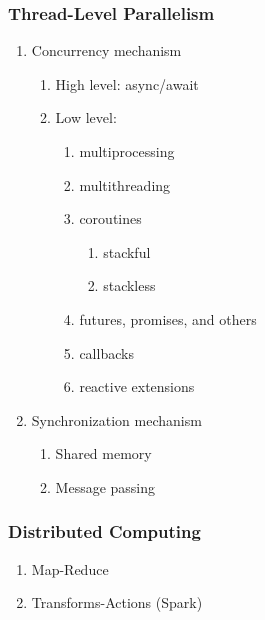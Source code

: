 \documentclass{article}
\begin{document}
\subsubsection{Thread-Level Parallelism}
\begin{enumerate}
    \item Concurrency mechanism
    \begin{enumerate}
        \item High level: async/await
        \item Low level:
        \begin{enumerate}
            \item multiprocessing
            \item multithreading
            \item coroutines
            \begin{enumerate}
                \item stackful
                \item stackless
            \end{enumerate}
            \item futures, promises, and others
            \item callbacks
            \item reactive extensions
        \end{enumerate}
    \end{enumerate}
    \item Synchronization mechanism
    \begin{enumerate}
        \item Shared memory
        \item Message passing
    \end{enumerate}
\end{enumerate}
\subsubsection{Distributed Computing}
\begin{enumerate}
    \item Map-Reduce
    \item Transforms-Actions (Spark)
\end{enumerate}
\end{document}
